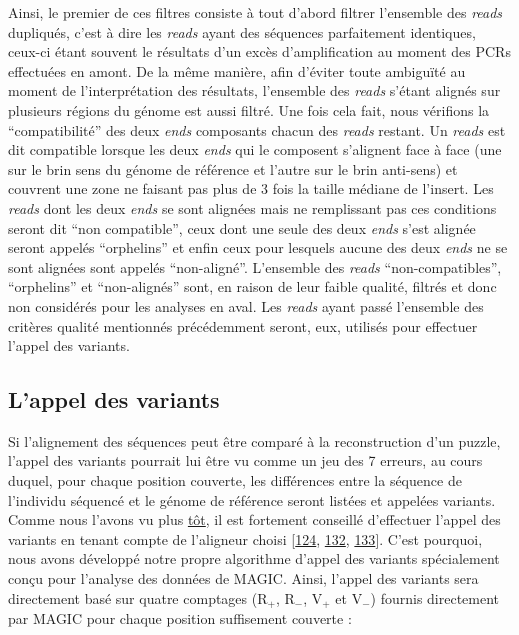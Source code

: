 \documentclass[12pt,twoside]{reedthesis}
\theoremstyle{definition}
\theoremstyle{definition}
\theoremstyle{remark}
\begin{document}
  Ainsi, le premier de ces filtres consiste à tout d'abord filtrer
  l'ensemble des \emph{reads} dupliqués, c'est à dire les \emph{reads}
  ayant des séquences parfaitement identiques, ceux-ci étant souvent le
  résultats d'un excès d'amplification au moment des PCRs effectuées en
  amont. De la même manière, afin d'éviter toute ambiguïté au moment de
  l'interprétation des résultats, l'ensemble des \emph{reads} s'étant
  alignés sur plusieurs régions du génome est aussi filtré. Une fois cela
  fait, nous vérifions la ``compatibilité'' des deux \emph{ends}
  composants chacun des \emph{reads} restant. Un \emph{reads} est dit
  compatible lorsque les deux \emph{ends} qui le composent s'alignent face
  à face (une sur le brin sens du génome de référence et l'autre sur le
  brin anti-sens) et couvrent une zone ne faisant pas plus de 3 fois la
  taille médiane de l'insert. Les \emph{reads} dont les deux \emph{ends}
  se sont alignées mais ne remplissant pas ces conditions seront dit ``non
  compatible'', ceux dont une seule des deux \emph{ends} s'est alignée
  seront appelés ``orphelins'' et enfin ceux pour lesquels aucune des deux
  \emph{ends} ne se sont alignées sont appelés ``non-aligné''. L'ensemble
  des \emph{reads} ``non-compatibles'', ``orphelins'' et ``non-alignés''
  sont, en raison de leur faible qualité, filtrés et donc non considérés
  pour les analyses en aval. Les \emph{reads} ayant passé l'ensemble des
  critères qualité mentionnés précédemment seront, eux, utilisés pour
  effectuer l'appel des variants.
  
  \newpage
  
  \subsection{L'appel des variants}\label{lappel-des-variants}
  
  Si l'alignement des séquences peut être comparé à la reconstruction d'un
  puzzle, l'appel des variants pourrait lui être vu comme un jeu des 7
  erreurs, au cours duquel, pour chaque position couverte, les différences
  entre la séquence de l'individu séquencé et le génome de référence
  seront listées et appelées variants. Comme nous l'avons vu plus
  \protect\hyperlink{varcall}{tôt}, il est fortement conseillé d'effectuer
  l'appel des variants en tenant compte de l'aligneur choisi
  {[}\protect\hyperlink{ref-Nielsen2011}{124},
  \protect\hyperlink{ref-DePristo2011}{132},
  \protect\hyperlink{ref-Lunter2011}{133}{]}. C'est pourquoi, nous avons
  développé notre propre algorithme d'appel des variants spécialement
  conçu pour l'analyse des données de MAGIC. Ainsi, l'appel des variants
  sera directement basé sur quatre comptages (R\(_+\), R\(_-\), V\(_+\) et
  V\(_-\)) fournis directement par MAGIC pour chaque position suffisement
  couverte :
  
\end{document}
